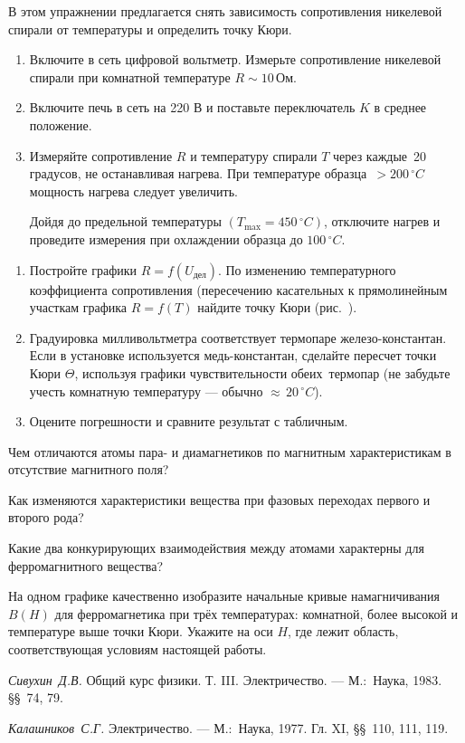 \begin{lab:task}

В этом упражнении предлагается снять зависимость сопротивления никелевой спирали от температуры и определить точку Кюри.

\begin{enumerate}
\item
  Включите в сеть цифровой вольтметр. Измерьте сопротивление никелевой спирали при комнатной температуре $R \sim 10\,\text{Ом}$.
\item
  Включите печь в сеть на 220 В и поставьте переключатель $K$ в среднее положение.
\item
  Измеряйте сопротивление $R$ и температуру спирали $T$ через \mbox{каждые 20} градусов, не останавливая нагрева. При температуре \mbox{образца $\greater200\,^{\circ}C$} мощность нагрева следует увеличить.

Дойдя до предельной температуры $(T_\text{max} = 450\,^{\circ}C)$, отключите нагрев и проведите измерения при охлаждении образца до $100\,^{\circ}C$.
\end{enumerate}

\begin{enumerate}
\item
  Постройте графики $R = f(U_\text{дел})$. По изменению температурного коэффициента сопротивления (пересечению касательных к прямолинейным участкам графика $R = f(T)$ найдите точку Кюри (рис.~).
\item
  Градуировка милливольтметра соответствует термопаре железо-кон\-стантан. Если в установке используется медь-константан, сделайте пересчет точки Кюри $\Theta$, используя графики чувствительности \mbox{обеих тер}\-мопар (не забудьте учесть комнатную температуру --- обычно $\approx\,20\,^{\circ}C$).
\item
  Оцените погрешности и сравните результат с табличным.
\end{enumerate}
\end{lab:task}

\begin{lab:questions}

\item
  Чем отличаются атомы пара- и диамагнетиков по магнитным характеристикам в отсутствие магнитного поля?
\item
  Как изменяются характеристики вещества при фазовых переходах первого и второго рода?
\item
  Какие два конкурирующих взаимодействия между атомами характерны для ферромагнитного вещества?
\item
  На одном графике качественно изобразите начальные кривые намагничивания $B(H)$ для ферромагнетика при трёх температурах: комнатной, более высокой и температуре выше точки Кюри. Укажите на оси $H$, где лежит область, соответствующая условиям настоящей работы.

\end{lab:questions}

\begin{lab:literature}

\item
  \emph{Сивухин~Д.В.} Общий курс физики. Т. III. Электричество. --- М.:~Наука, 1983. \S\S~74, 79.
\item
  \emph{Калашников~С.Г.} Электричество. --- М.:~Наука, 1977. Гл. XI, \S\S~110, 111, 119.
\end{lab:literature}

